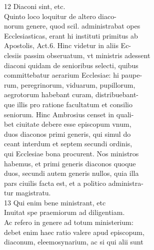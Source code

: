 \documentclass{article}
\begin{document}
\begin{pages}
                12 Diaconi sint, etc. \\
                Quinto loco loquitur de altero diaco- \\
                norum genere, quod scil. administrabat opes \\
                Ecclesiasticas, erant hi instituti primitus ab \\
                Apostolis, Act.6. Hinc videtur in aliis Ec- \\
                clesiis passim obseruatum, vt ministris adessent \\
                diaconi quidam de senioribus selecti, quibus \\
                committebatur aerarium Ecclesiae: hi paupe- \\
                rum, peregrinorum, viduarum, pupillorum, \\
                aegrotorum habebant curam, distribuebant- \\
                que illis pro ratione facultatum et consilio \\
                seniorum. Hinc Ambrosius censet in quali- \\
                bet ciuitate debere esse episcopum vnum, \\
                duos diaconos primi generis, qui simul do \\
                ceant interdum et septem secundi ordinis, \\
                qui Ecclesiae bona procurent. Nos ministros \\
                habemus, et primi generis diaconos quoque \\
                duos, secundi autem generis nullos, quia illa \\
                pars ciuilis facta est, et a politico administra- \\
                tur magistratu. \\
                13 Qui enim bene ministrant, etc \\
                Inuitat spe praemiorum ad diligentiam. \\
                Ac refero in genere ad totum ministerium: \\
                debet enim haec ratio valere apud episcopum, \\
                diaconum, eleemosynarium, ac si qui alii sunt \\

\end{pages}
\end{document}

